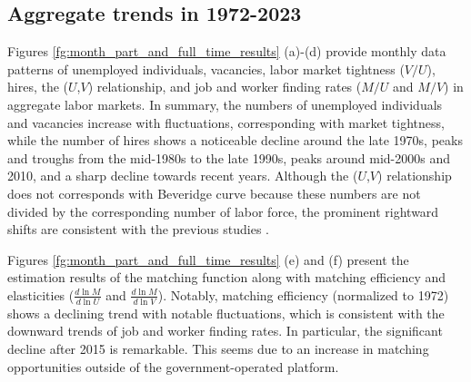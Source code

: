 \documentclass[12pt]{article}
\begin{document}
\subsection{Aggregate trends in 1972-2023}\label{sec:month_level}

Figures \ref{fg:month_part_and_full_time_results} (a)-(d) provide monthly data patterns of unemployed individuals, vacancies, labor market tightness (\(V/U\)), hires, the  ($U$,$V$) relationship, and job and worker finding rates (\(M/U\) and \(M/V\)) in aggregate labor markets. 
In summary, the numbers of unemployed individuals and vacancies increase with fluctuations, corresponding with market tightness, while the number of hires shows a noticeable decline around the late 1970s, peaks and troughs from the mid-1980s to the late 1990s, peaks around mid-2000s and 2010, and a sharp decline towards recent years.
Although the ($U$,$V$) relationship does not corresponds with Beveridge curve because these numbers are not divided by the corresponding number of labor force, the prominent rightward shifts are consistent with the previous studies \citep{elsby2015beveridge}.

Figures \ref{fg:month_part_and_full_time_results} (e) and (f) present the estimation results of the matching function along with matching efficiency and elasticities (\(\frac{d\ln M}{d\ln U}\) and \(\frac{d\ln M}{d\ln V}\)). Notably, matching efficiency (normalized to 1972) shows a declining trend with notable fluctuations, which is consistent with the downward trends of job and worker finding rates. 
In particular, the significant decline after 2015 is remarkable.
This seems due to an increase in matching opportunities outside of the government-operated platform.
\end{document}
